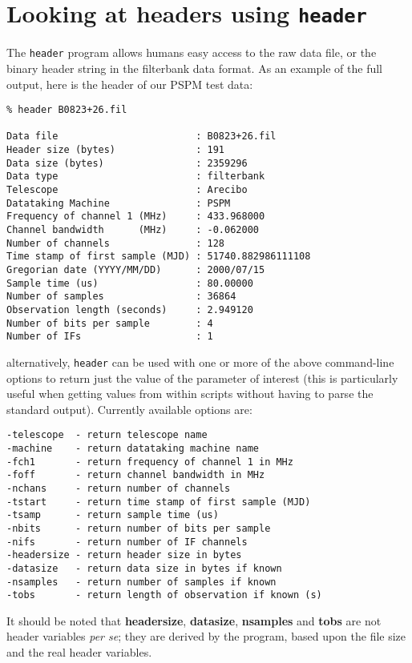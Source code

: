 \documentclass[11pt]{article}
\begin{document}
\section{Looking at headers using {\tt header}}
\label{headers}
The {\tt header} program allows humans easy access to the raw data
file, or the binary header string in the filterbank data format.  
As an example of the full
output, here is the header of our PSPM test data:
\begin{verbatim}
% header B0823+26.fil

Data file                        : B0823+26.fil
Header size (bytes)              : 191
Data size (bytes)                : 2359296
Data type                        : filterbank
Telescope                        : Arecibo
Datataking Machine               : PSPM
Frequency of channel 1 (MHz)     : 433.968000
Channel bandwidth      (MHz)     : -0.062000
Number of channels               : 128
Time stamp of first sample (MJD) : 51740.882986111108
Gregorian date (YYYY/MM/DD)      : 2000/07/15
Sample time (us)                 : 80.00000
Number of samples                : 36864
Observation length (seconds)     : 2.949120
Number of bits per sample        : 4
Number of IFs                    : 1
\end{verbatim}
alternatively, {\tt header} can be used with one or more of the
above command-line options to return just the value of the
parameter of interest (this is particularly useful when 
getting values from within scripts without having to parse
the standard output). Currently available options are:
\begin{verbatim}
-telescope  - return telescope name
-machine    - return datataking machine name
-fch1       - return frequency of channel 1 in MHz
-foff       - return channel bandwidth in MHz
-nchans     - return number of channels
-tstart     - return time stamp of first sample (MJD)
-tsamp      - return sample time (us)
-nbits      - return number of bits per sample
-nifs       - return number of IF channels
-headersize - return header size in bytes
-datasize   - return data size in bytes if known
-nsamples   - return number of samples if known
-tobs       - return length of observation if known (s)
\end{verbatim}
It should be noted that {\bf headersize}, {\bf datasize}, {\bf
nsamples} and {\bf tobs} are not header variables {\it per se};
they are derived by the program, based upon the file size and the real
header variables.

\clearpage
\end{document}
